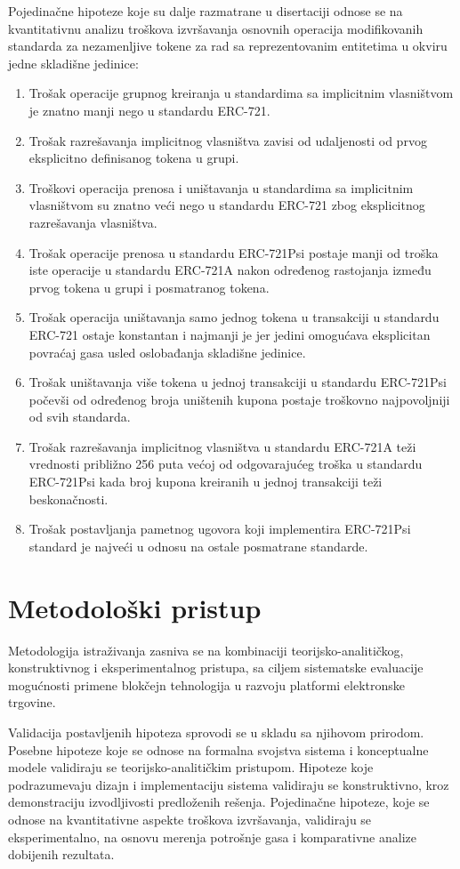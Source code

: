 Pojedinačne hipoteze koje su dalje razmatrane u disertaciji odnose se na kvantitativnu analizu troškova izvršavanja osnovnih operacija modifikovanih standarda za nezamenljive tokene za rad sa reprezentovanim entitetima u okviru jedne skladišne jedinice:
\begin{enumerate}
\item Trošak operacije grupnog kreiranja u standardima sa implicitnim vlasništvom je znatno manji nego u standardu ERC-721.
\item Trošak razrešavanja implicitnog vlasništva zavisi od udaljenosti od prvog eksplicitno definisanog tokena u grupi.
\item Troškovi operacija prenosa i uništavanja u standardima sa implicitnim vlasništvom su znatno veći nego u standardu ERC-721 zbog eksplicitnog razrešavanja vlasništva.
\item Trošak operacije prenosa u standardu ERC-721Psi postaje manji od troška iste operacije u standardu ERC-721A nakon određenog rastojanja između prvog tokena u grupi i posmatranog tokena.
\item Trošak operacija uništavanja samo jednog tokena u transakciji u standardu ERC-721 ostaje konstantan i najmanji je jer jedini omogućava eksplicitan povraćaj gasa usled oslobađanja skladišne jedinice.
\item Trošak uništavanja više tokena u jednoj transakciji u standardu ERC-721Psi počevši od određenog broja uništenih kupona postaje troškovno najpovoljniji od svih standarda.
\item Trošak razrešavanja implicitnog vlasništva u standardu ERC-721A teži vrednosti približno 256 puta većoj od odgovarajućeg troška u standardu ERC-721Psi kada broj kupona kreiranih u jednoj transakciji teži beskonačnosti.
\item Trošak postavljanja pametnog ugovora koji implementira ERC-721Psi standard je najveći u odnosu na ostale posmatrane standarde.
\end{enumerate}

\section{Metodološki pristup}
Metodologija istraživanja zasniva se na kombinaciji teorijsko-analitičkog, konstruktivnog i eksperimentalnog pristupa, sa ciljem sistematske evaluacije mogućnosti primene blokčejn tehnologija u razvoju platformi elektronske trgovine.

Validacija postavljenih hipoteza sprovodi se u skladu sa njihovom prirodom. Posebne hipoteze koje se odnose na formalna svojstva sistema i konceptualne modele validiraju se teorijsko-analitičkim pristupom. Hipoteze koje podrazumevaju dizajn i implementaciju sistema validiraju se konstruktivno, kroz demonstraciju izvodljivosti predloženih rešenja. Pojedinačne hipoteze, koje se odnose na kvantitativne aspekte troškova izvršavanja, validiraju se eksperimentalno, na osnovu merenja potrošnje gasa i komparativne analize dobijenih rezultata.

